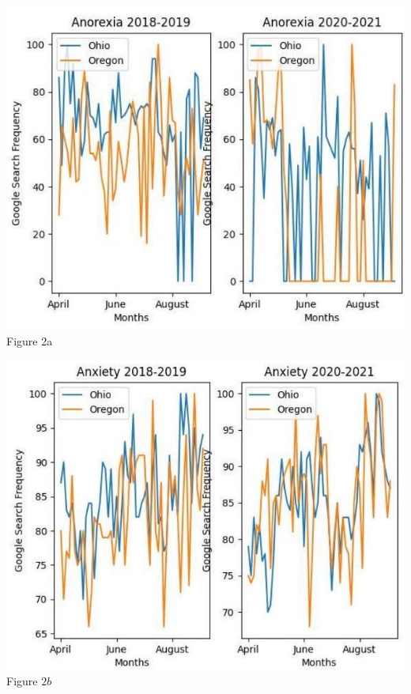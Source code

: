 \documentclass{article}
\begin{document}
\begin{center}
\includegraphics[scale=0.5]{2023_08_04_7b2b5ae1fb9d756e7758g-4}
\\ Figure 2a
\end{center}

\begin{center}
\includegraphics[scale=0.5]{2023_08_04_7b2b5ae1fb9d756e7758g-4(1)}
\\ Figure $2 b$
\end{center}
\end{document}
